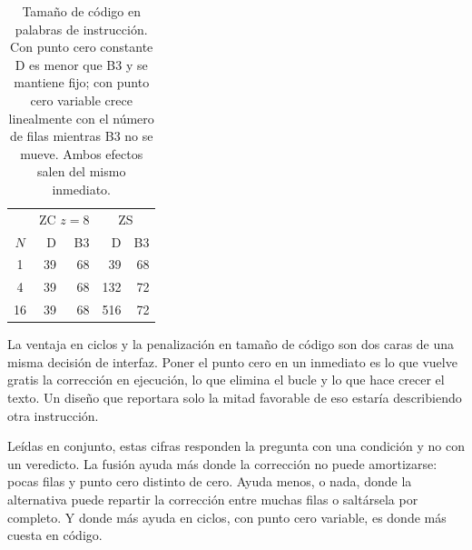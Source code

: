 \begin{table}[!htbp]
\caption{Tamaño de código en palabras de instrucción. Con punto cero constante D
es menor que B3 y se mantiene fijo; con punto cero variable crece linealmente
con el número de filas mientras B3 no se mueve. Ambos efectos salen del mismo
inmediato.}
\label{tab:code}
\centering
\begin{tabular}{crrrr}
\hline
 & \multicolumn{2}{c}{ZC \(z{=}8\)} & \multicolumn{2}{c}{ZS} \\
\(N\) & D & B3 & D & B3 \\
\hline
1 & 39 & 68 & 39 & 68 \\
4 & 39 & 68 & 132 & 72 \\
16 & 39 & 68 & 516 & 72 \\
\hline
\end{tabular}
\end{table}

La ventaja en ciclos y la penalización en tamaño de código son dos caras de una
misma decisión de interfaz. Poner el punto cero en un inmediato es lo que vuelve
gratis la corrección en ejecución, lo que elimina el bucle y lo que hace crecer
el texto. Un diseño que reportara solo la mitad favorable de eso estaría
describiendo otra instrucción.

Leídas en conjunto, estas cifras responden la pregunta con una condición y no
con un veredicto. La fusión ayuda más donde la corrección no puede amortizarse:
pocas filas y punto cero distinto de cero. Ayuda menos, o nada, donde la
alternativa puede repartir la corrección entre muchas filas o saltársela por
completo. Y donde más ayuda en ciclos, con punto cero variable, es donde más
cuesta en código.

